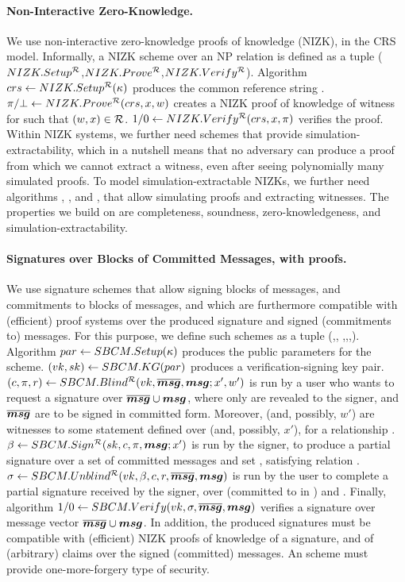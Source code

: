 \paragraph{Non-Interactive Zero-Knowledge.} %
We use non-interactive zero-knowledge proofs of knowledge (NIZK), in the CRS
model. Informally, a NIZK scheme over an NP relation \NIZKRel is defined as a
tuple ($NIZK.Setup^{\mathcal{R}}$,$NIZK.Prove^{\mathcal{R}}$,$NIZK.Verify^\mathcal{R}$).
Algorithm $crs \gets NIZK.Setup^{\mathcal{R}}(\kappa)$ produces the common
reference string \NIZKcrs. $\pi/\bot \gets NIZK.Prove^{\mathcal{R}}(crs,
x,w)$ creates a NIZK proof of knowledge of witness \NIZKw for \NIZKx
such that $(w,x) \in \mathcal{R}$. $1/0 \gets NIZK.Verify^{\mathcal{R}}
(crs,x,\pi)$ verifies the proof. Within NIZK systems, we
further need schemes that provide simulation-extractability, which in a nutshell
means that no adversary can produce a proof from which we cannot extract a
witness, even after seeing polynomially many simulated proofs. To model
simulation-extractable NIZKs, we further need algorithms \NIZKSimSetup,
\NIZKSim, and \NIZKExtract, that allow simulating proofs and extracting
witnesses. The properties we build on are completeness, soundness,
zero-knowledgeness, and simulation-extractability.

\paragraph{Signatures over Blocks of Committed Messages, with proofs.} %
We use signature schemes that allow signing blocks of messages, and commitments
to blocks of messages, and which are furthermore compatible with (efficient)
proof systems over the produced signature and signed (commitments to) messages.
For this purpose, we define such schemes as a tuple (\SBCMSetup,\SBCMKeyGen,
\SBCMBlind,\SBCMSign,\SBCMUnblind,\SBCMVerify).
%
Algorithm $par \gets SBCM.Setup(\kappa)$ produces the public parameters for
the scheme.
% 
$(vk,sk) \gets SBCM.KG(par)$ produces a verification-signing key pair.
%
$(c,\pi,r) \gets SBCM.Blind^{\mathcal{R}}(vk,\overline{\boldsymbol{msg}},\boldsymbol{msg};x',w')$ is run by a
user who wants to request a signature over $\overline{\boldsymbol{msg}} \cup \boldsymbol{msg}$, where only \smsg
are revealed to the signer, and $\overline{\boldsymbol{msg}}$ are to be signed in committed form.
Moreover, \osmsg (and, possibly, $w'$) are witnesses to some statement defined
over \smsg (and, possibly, $x'$), for a relationship \NIZKRel.
%
$\beta \gets SBCM.Sign^{\mathcal{R}}(sk,c,\pi,\boldsymbol{msg}; x')$ is run by the
signer, to produce a partial signature \bsig over a set of committed
messages and set \smsg, satisfying relation \NIZKRel.
%
$\sigma \gets SBCM.Unblind^{\mathcal{R}}(vk,\beta,c,r,\overline{\boldsymbol{msg}},\boldsymbol{msg})$ is
run by the user to complete a partial signature \bsig received by the
signer, over \osmsg (committed to in \Ccom) and \smsg.
%
Finally, algorithm $1/0 \gets SBCM.Verify(vk,\sigma,\overline{\boldsymbol{msg}},\boldsymbol{msg})$ verifies a
signature \sig over message vector $\overline{\boldsymbol{msg}} \cup \boldsymbol{msg}$.
%
In addition, the produced signatures must be compatible with (efficient) NIZK
proofs of knowledge of a signature, and of (arbitrary) claims over the signed
(committed) messages. An \SBCM scheme must provide one-more-forgery type of
security.


